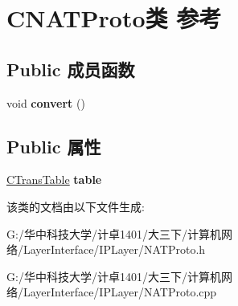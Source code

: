 \hypertarget{class_c_n_a_t_proto}{}\section{C\+N\+A\+T\+Proto类 参考}
\label{class_c_n_a_t_proto}
\subsection*{Public 成员函数}
\begin{DoxyCompactItemize}
\item 
\mbox{\label{class_c_n_a_t_proto_a249f93030dfaa686dfffb0f785658ca4}} 
void {\bfseries convert} ()
\end{DoxyCompactItemize}
\subsection*{Public 属性}
\begin{DoxyCompactItemize}
\item 
\mbox{\label{class_c_n_a_t_proto_a7fde6c1c8e6840ae207f305e85288668}} 
\hyperlink{class_c_trans_table}{C\+Trans\+Table} {\bfseries table}
\end{DoxyCompactItemize}


该类的文档由以下文件生成\+:\begin{DoxyCompactItemize}
\item 
G\+:/华中科技大学/计卓1401/大三下/计算机网络/\+Layer\+Interface/\+I\+P\+Layer/N\+A\+T\+Proto.\+h\item 
G\+:/华中科技大学/计卓1401/大三下/计算机网络/\+Layer\+Interface/\+I\+P\+Layer/N\+A\+T\+Proto.\+cpp\end{DoxyCompactItemize}

